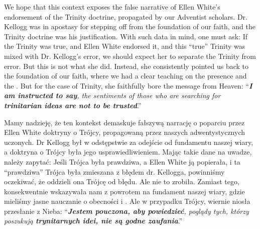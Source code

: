 We hope that this context exposes the false narrative of Ellen White's endorsement of the Trinity doctrine, propagated by our Adventist scholars. Dr. Kellogg was in apostasy for stepping off from the foundation of our faith, and the Trinity doctrine was his justification. With such data in mind, one must ask: If the Trinity was true, and Ellen White endorsed it, and this “true” Trinity was mixed with Dr. Kellogg's error, we should expect her to separate the Trinity from error. But this is not what she did. Instead, she consistently pointed us back to the foundation of our faith, where we had a clear teaching on the presence and the . But for the case of Trinity, she faithfully bore the message from Heaven: “\textit{\textbf{I am instructed to say}, the sentiments of those who are searching for \textbf{trinitarian ideas are not to be trusted}}.”


Mamy nadzieję, że ten kontekst demaskuje fałszywą narrację o poparciu przez Ellen White doktryny o Trójcy, propagowaną przez naszych adwentystycznych uczonych. Dr Kellogg był w odstępstwie za odejście od fundamentu naszej wiary, a doktryna o Trójcy była jego usprawiedliwieniem. Mając takie dane na uwadze, należy zapytać: Jeśli Trójca była prawdziwa, a Ellen White ją popierała, i ta “prawdziwa” Trójca była zmieszana z błędem dr. Kellogga, powinniśmy oczekiwać, że oddzieli ona Trójcę od błędu. Ale nie to zrobiła. Zamiast tego, konsekwentnie wskazywała nam z powrotem na fundament naszej wiary, gdzie mieliśmy jasne nauczanie o obecności i . Ale w przypadku Trójcy, wiernie niosła przesłanie z Nieba: “\textit{\textbf{Jestem pouczona, aby powiedzieć}, poglądy tych, którzy poszukują \textbf{trynitarnych idei, nie są godne zaufania}}.”



% 